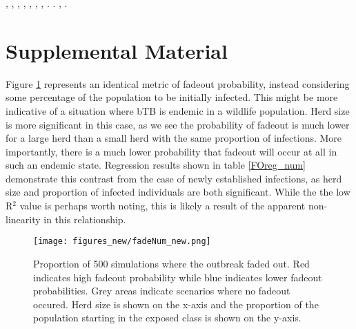 \documentclass[number,preprint,review,12pt]{elsarticle}
\begin{document}
\begin{thebibliography}{31}
, ,
  , ,
  , ,
  , .
\newblock {}.
\newblock {} ,
  .

\end{thebibliography}
\pagebreak
\renewcommand{\thefigure}{S\arabic{figure}}
\renewcommand{\thetable}{S\arabic{table}}
\renewcommand\theequation{S\arabic{equation}}

\setcounter{equation}{0}
\setcounter{figure}{0}
\setcounter{table}{0}
\section{Supplemental Material}

    Figure \ref{fadePropPct} represents an identical metric of fadeout probability, instead considering some percentage of the population to be initially infected. This might be more indicative of a situation where bTB is endemic in a wildlife population. Herd size is more significant in this case, as we see the probability of fadeout is much lower for a large herd than a small herd with the same proportion of infections. More importantly, there is a much lower probability that fadeout will occur at all in such an endemic state. Regression results shown in table \ref{FOreg_num} demonstrate this contrast from the case of newly established infections, as herd size and proportion of infected individuals are both significant. While the the low R$^2$ value is perhaps worth noting, this is likely a result of the apparent non-linearity in this relationship.
    
    \begin{figure}[H]
        \centering
        \texttt{[image: figures\_new/fadeNum\_new.png]}
        \caption{Proportion of 500 simulations where the outbreak faded out. Red indicates high fadeout probability while blue indicates lower fadeout probabilities. Grey areas indicate scenarios where no fadeout occured. Herd size is shown on the x-axis and the proportion of the population starting in the exposed class is shown on the y-axis.}
        \label{fadePropPct}
    \end{figure}
    
\end{document}
